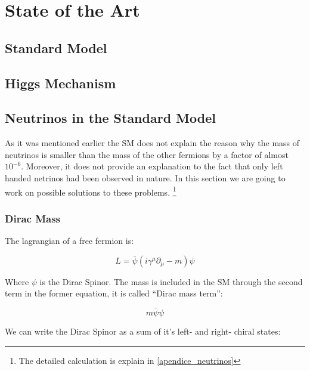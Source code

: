 \chapter{State of the Art} 

\section{Standard Model}

\section{Higgs Mechanism}

\section{Neutrinos in the Standard Model}

As it was mentioned earlier the SM does not explain the reason why the mass of neutrinos is smaller than the mass of the other fermions by a factor of almost $10^{-6}$. Moreover, it does not
provide an explanation to the fact that only left handed netrinos had been observed in nature. 
In this section we are going to work on possible solutions to these problems. \footnote{The detailed calculation is explain in \ref{apendice_neutrinos}}

\subsection{Dirac Mass}
The lagrangian of a free fermion is:

\begin{equation}
 L = \bar{\psi} \left( i \gamma ^\mu \partial_{\mu} - m \right) \psi
\end{equation}

Where $\psi$ is the Dirac Spinor. The mass is included in the SM through the second term in the former equation, it is called ``Dirac mass term'':

\begin{equation}
 m \bar{\psi} \psi
\end{equation}

We can write the Dirac Spinor as a sum of it's left- and right- chiral states:

